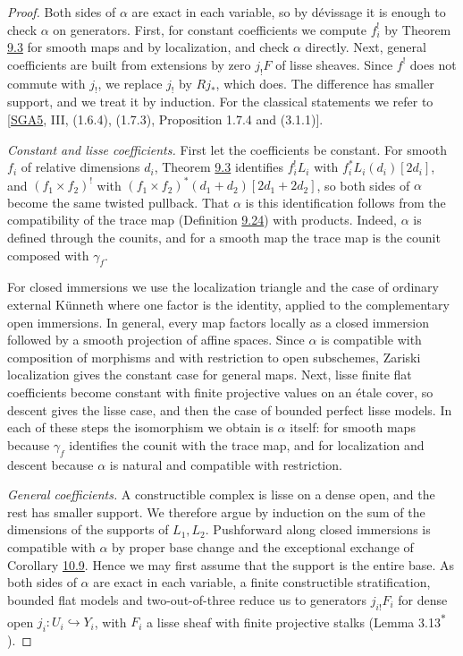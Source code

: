 \documentclass[11pt]{article}
\newcommand{\bpout}[1]{#1\textsuperscript{\hyperlink{bp-outside}{\ensuremath{\ast}}}}
\begin{document}
\begin{proof}[{Proof}]\label{bp189}%
Both sides of \(\alpha\) are exact in each variable, so by dévissage it is enough to check \(\alpha\) on generators. First, for constant coefficients we compute \(f_i^!\) by Theorem \hyperref[bp11]{9.3} for smooth maps and by localization, and check \(\alpha\) directly. Next, general coefficients are built from extensions by zero \(j_!F\) of lisse sheaves. Since \(f^!\) does not commute with \(j_!\), we replace \(j_!\) by \(Rj_*\), which does. The difference has smaller support, and we treat it by induction. For the classical statements we refer to [\hyperref[bp332]{SGA5}, III, (1.6.4), (1.7.3), Proposition 1.7.4 and (3.1.1)].

\emph{Constant and lisse coefficients.} First let the coefficients be constant. For smooth \(f_i\) of relative dimensions \(d_i\), Theorem \hyperref[bp11]{9.3} identifies \(f_i^!L_i\) with \(f_i^*L_i(d_i)[2d_i]\), and \((f_1\times f_2)^!\) with \((f_1\times f_2)^*(d_1+d_2)[2d_1+2d_2]\), so both sides of \(\alpha\) become the same twisted pullback. That \(\alpha\) is this identification follows from the compatibility of the trace map (Definition \hyperref[bp85]{9.24}) with products. Indeed, \(\alpha\) is defined through the counits, and for a smooth map the trace map is the counit composed with \(\gamma_f\).

For closed immersions we use the localization triangle and the case of ordinary external Künneth where one factor is the identity, applied to the complementary open immersions. In general, every map factors locally as a closed immersion followed by a smooth projection of affine spaces. Since \(\alpha\) is compatible with composition of morphisms and with restriction to open subschemes, Zariski localization gives the constant case for general maps. Next, lisse finite flat coefficients become constant with finite projective values on an étale cover, so descent gives the lisse case, and then the case of bounded perfect lisse models. In each of these steps the isomorphism we obtain is \(\alpha\) itself: for smooth maps because \(\gamma_f\) identifies the counit with the trace map, and for localization and descent because \(\alpha\) is natural and compatible with restriction.

\emph{General coefficients.} A constructible complex is lisse on a dense open, and the rest has smaller support. We therefore argue by induction on the sum of the dimensions of the supports of \(L_1,L_2\). Pushforward along closed immersions is compatible with \(\alpha\) by proper base change and the exceptional exchange of Corollary \hyperref[bp128]{10.9}. Hence we may first assume that the support is the entire base. As both sides of \(\alpha\) are exact in each variable, a finite constructible stratification, bounded flat models and two-out-of-three reduce us to generators \(j_{i!}F_i\) for dense open \(j_i:U_i\hookrightarrow Y_i\), with \(F_i\) a lisse sheaf with finite projective stalks (Lemma \bpout{3.13}).


\end{proof}
\end{document}
